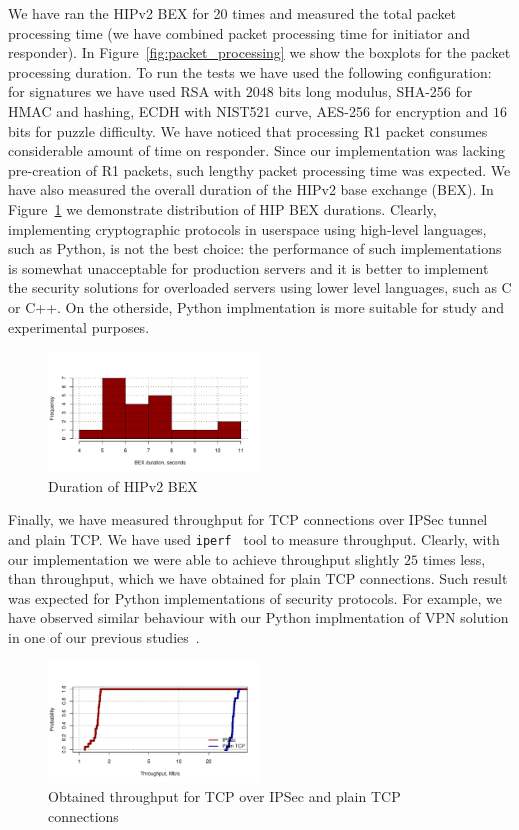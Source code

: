We have ran the HIPv2 BEX for 20 times and measured the total packet processing time (we have combined packet 
processing time for initiator and responder). In Figure~\ref{fig:packet_processing} we show the boxplots for 
the packet processing duration. To run the tests we have used the following configuration: for signatures 
we have used RSA with $2048$ bits long modulus, SHA-256 for HMAC and hashing, ECDH with NIST521 curve, 
AES-256 for encryption and $16$ bits for puzzle difficulty. We have noticed that processing R1 packet consumes considerable
amount of time on responder. Since our implementation was lacking pre-creation of R1 packets, such lengthy packet 
processing time was expected. We have also measured the overall duration of the HIPv2 base exchange (BEX). 
In Figure~\ref{fig:duration_bex} we demonstrate distribution of HIP BEX durations. Clearly, implementing 
cryptographic protocols in userspace using high-level languages, such as Python, is not the best choice: the performance
of such implementations is somewhat unacceptable for production servers and it is better to implement the security 
solutions for overloaded servers using lower level languages, such as C or C++. On the otherside, Python implmentation
is more suitable for study and experimental purposes.

\begin{figure}
	\includegraphics[width=0.5\textwidth]{graphics/duration_bex.pdf}
	\caption{Duration of HIPv2 BEX}
	\label{fig:duration_bex}
\end{figure}

Finally, we have measured throughput for TCP connections over IPSec tunnel and plain TCP. We have used
\texttt{iperf}~\cite{iperf} tool to measure throughput. Clearly, with our implementation we were able to achieve
throughput slightly $25$ times less, than throughput, which we have obtained for plain TCP connections.
Such result was expected for Python implementations of security protocols. For example, we have 
observed similar behaviour with our Python implmentation of VPN solution in one of our previous 
studies~\cite{vpn}.

\begin{figure}
	\includegraphics[width=0.5\textwidth]{graphics/throughput.pdf}
	\caption{Obtained throughput for TCP over IPSec and plain TCP connections}
	\label{fig:throughput}
\end{figure}
